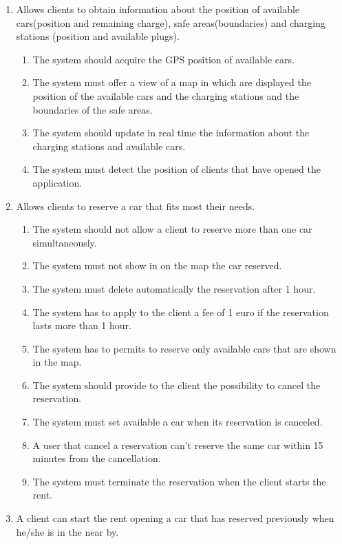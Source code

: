 \begin{enumerate}
\item Allows clients to obtain information about
the position of available cars(position and remaining charge), safe areas(boundaries) and charging stations (position and available plugs).
\begin{enumerate}
\item The system should acquire the GPS position of available cars.
\item The system must offer a view of a map in which are displayed the position of the available cars and the charging stations and the boundaries of the safe areas.
\item The system should update in real time the information about the charging stations and available cars.
\item The system must detect the position of clients that have opened the application.
\end{enumerate}


\item Allows clients to reserve a car that fits most their needs.
\begin{enumerate}
\item  The system should not allow a client to reserve more than one car simultaneously.
\item The system must not show in on the map the car reserved. 
\item The system must delete automatically the reservation after 1 hour.
\item The system has to apply to the client a fee of 1 euro if the reservation lasts more than 1 hour.
\item The system has to permits to reserve only available cars that are shown in the map.
\item The system should provide to the client the possibility to cancel the reservation.
\item The system must set available a car when its reservation is canceled.
\item A user that cancel a reservation can't reserve the same car within 15 minutes from the cancellation.
\item The system must terminate the reservation when the client starts the rent.
\end{enumerate}


\item A client can start the rent opening a car that has reserved previously when he/she is in the near by.


\end{enumerate}

